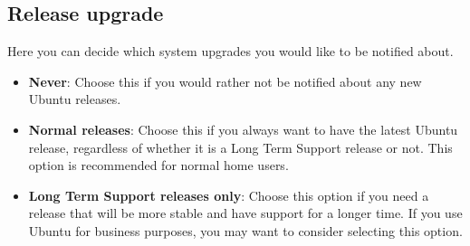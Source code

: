\subsection{Release upgrade}

Here you can decide which system upgrades you would like to be notified about.

\begin{itemize}
	\item \textbf{Never}: Choose this if you would rather not be notified about any new Ubuntu releases.
	\item \textbf{Normal releases}: Choose this if you always want to have the latest Ubuntu release, regardless of whether it is a Long Term Support release or not. This option is recommended for normal home users.
	\item \textbf{Long Term Support releases only}: Choose this option if you need a release that will be more stable and have support for a longer time. If you use Ubuntu for business purposes, you may want to consider selecting this option.
\end{itemize}
